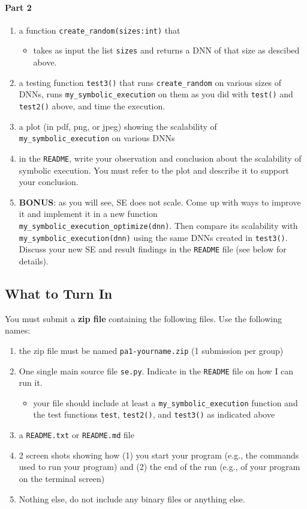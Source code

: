 \documentclass[oneside,11pt,dvipsnames]{book}
\numberwithin{equation}{section}
\theoremstyle{definition}
\theoremstyle{remark}
\newcommand{\code}[1]{\texttt{#1}}
\begin{document}
\paragraph{Part 2}
\begin{enumerate}
\item a function \code{create\_random(sizes:int)} that
\begin{itemize}
    \item takes as input the list \code{sizes} and returns a DNN of that size as descibed above.
\end{itemize}
\item a testing function \code{test3()} that runs \code{create\_random} on various sizes of DNNs, runs \code{my\_symbolic\_execution} on them as you did with \code{test()} and \code{test2()} above, and time the execution.
\item a plot (in pdf, png, or jpeg) showing the scalability of \code{my\_symbolic\_execution} on various DNNs
\item in the \code{README}, write your observation and conclusion about the scalability of symbolic execution.  You must refer to the plot and describe it to support your conclusion.
\item \textbf{BONUS}: as you will see, SE does not scale. Come up with ways to improve it and implement it in a new function \code{my\_symbolic\_execution\_optimize(dnn)}. Then compare its scalability with \code{my\_symbolic\_execution(dnn)} using the same DNNs created in \code{test3()}.  Discuss your new SE and result findings in the \code{README} file (see below for details).

\end{enumerate}

\subsection{What to Turn In}

You must submit a \textbf{zip file} containing the following files. Use the following names:

\begin{enumerate}
\item the zip file must be named \code{pa1-yourname.zip} (1 submission per group)
\item One single main source file \code{se.py}. Indicate in the \code{README} file on how I can run it.
    \begin{itemize}
    \item your file should include at least a \code{my\_symbolic\_execution} function and the test functions \code{test}, \code{test2()}, and \code{test3()} as indicated above
    \end{itemize}
\item a \code{README.txt} or \code{README.md} file
\item 2 screen shots showing how (1) you start your program (e.g., the commands used to run your program) and (2) the end of the run (e.g., of your program on the terminal screen)
\item Nothing else, do not include any binary files or anything else.
\end{enumerate}
\end{document}
